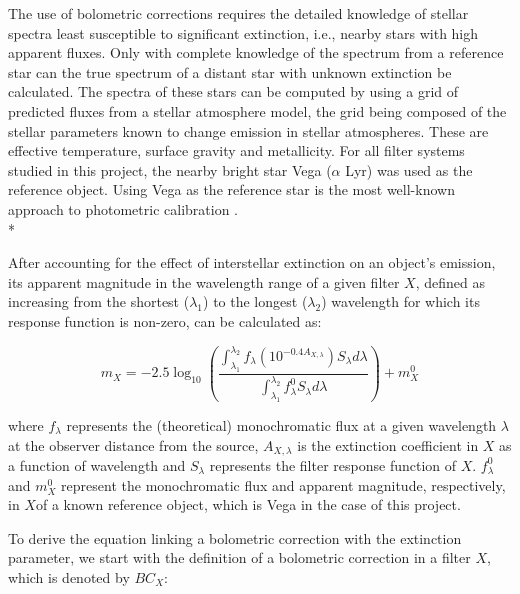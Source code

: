 \documentclass[12pt, a4paper]{report}
\begin{document}
The use of bolometric corrections requires the detailed knowledge of stellar spectra least susceptible to significant extinction, i.e., nearby stars with high apparent fluxes. Only with complete knowledge of the spectrum from a reference star can the true spectrum of a distant star with unknown extinction be calculated. The spectra of these stars can be computed by using a grid of predicted fluxes from a stellar atmosphere model, the grid being composed of the stellar parameters known to change emission in stellar atmospheres. These are effective temperature, surface gravity and metallicity. For all filter systems studied in this project, the nearby bright star Vega ($\alpha$ Lyr) was used as the reference object. Using Vega as the reference star is the most well-known approach to photometric calibration \citep{2014MNRAS.444..392C}.\\*

After accounting for the effect of interstellar extinction on an object's emission, its apparent magnitude in the wavelength range of a given filter $X$, defined as increasing from the shortest ($\lambda_{1}$) to the longest ($\lambda_{2}$) wavelength for which its response function is non-zero, can be calculated as:

\begin{equation}
m_{X} = -2.5 \log_{10} \left(\frac{ \int_{\lambda_{1}}^{\lambda_{2}} f_{\lambda} \left( 10^{-0.4 A_{X,\lambda}} \right) S_{\lambda} d\lambda }{ \int_{\lambda_{1}}^{\lambda_{2}} f_{\lambda}^{0} S_{\lambda} d\lambda }\right) + m_{X}^{0}
\label{app_mag_def}
\end{equation}

where $f_{\lambda}$ represents the (theoretical) monochromatic flux at a given wavelength $\lambda$ at the observer distance from the source, $A_{X,\lambda}$ is the extinction coefficient in $X$ as a function of wavelength and $S_{\lambda}$ represents the filter response function of $X$. $f_{\lambda}^{0}$ and $m_{X}^{0}$ represent the monochromatic flux and apparent magnitude, respectively, in $X$of a known reference object, which is Vega in the case of this project.


To derive the equation linking a bolometric correction with the extinction parameter, we start with the definition of a bolometric correction in a filter $X$, which is denoted by $BC_{X}$:
\end{document}
